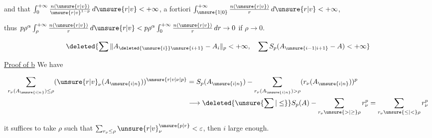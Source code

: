 and that $\int_0^{+\infty}\frac{n(\unsure{r|v})}{\unsure{r|v}^{1-p}}\,d\unsure{r|v}<+\infty$, a fortiori $\int_{\unsure{1|0}}^{+\infty}\frac{n(\unsure{r|v})}{r}\,d\unsure{r|v}<+\infty$,

thus $p\rho^\alpha\int_\rho^{+\infty}\frac{n(\unsure{r|v})}{r}\,d\unsure{r|v}<p\rho^\alpha\int_0^{+\infty}\frac{n(\unsure{r|v})}{r}\,dr\to0$ if $\rho\to0$.

\par\noindent\unsure{\rule{0.95\linewidth}{0.2pt}}\par


\[
\deleted{\sum\|A_{\deleted{\unsure{i}}\unsure{i+1}}-A_i\|_p<+\infty,\quad
\sum S_p(A_{\unsure{i-1|i+1}}-A)<+\infty}
\]


\uline{Proof of b} We have

\[
\begin{aligned}
\sum_{r_\nu(A_{\unsure{i|n}})\leq\rho}(\unsure{r|v}_\nu(A_{\unsure{i|n}}))^{\unsure{r|v|\nu|p}}&=S_p(A_{\unsure{i|n}})-\sum_{r_\nu(A_{\unsure{i|n}})>\rho}(r_\nu(A_{\unsure{i|n}}))^p\\
&\longrightarrow\deleted{\unsure{\sum|\leq}} S_p(A)-\sum_{r_\nu\unsure{>|\geq}\rho}r_\nu^p=\sum_{r_\nu\unsure{\leq|<}\rho}r_\nu^p
\end{aligned}
\]

it suffices to take $\rho$ such that $\sum_{r_\nu\leq\rho}\unsure{r|v}_\nu^{\unsure{p|r}}<\varepsilon$, then $i$ large enough.
